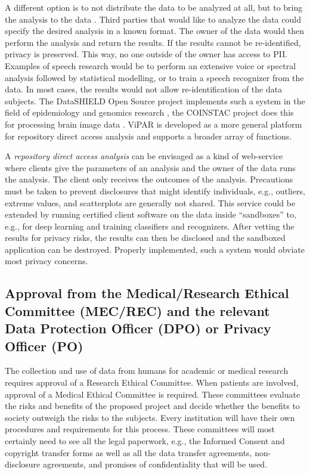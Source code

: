 \documentclass[10pt, a4paper]{article}
\begin{document}
A different option is to not distribute the data to be analyzed at all, but to bring the analysis to the data \cite{budin2015datashield,DataSHIELD2014}. Third parties that would like to analyze the data could specify the desired analysis in a known format. The owner of the data would then perform the analysis and return the results. If the results cannot be re-identified, privacy is preserved. This way, no one outside of the owner has access to PII. Examples of speech research would be to perform an extensive voice or spectral analysis followed by statistical modelling, or to train a speech recognizer from the data. In most cases, the results would not allow re-identification of the data subjects. The DataSHIELD Open Source project implements such a system in the field of epidemiology and genomics research \cite{DataSHIELD,DataSHIELD2014,wilson2017datashield,budin2015datashield}, the COINSTAC project does this for processing brain image data \cite{plis2016coinstac}. ViPAR \cite{carter2016vipar} is developed as a more general platform for repository direct access analysis and supports a broader array of functions.

A {\em repository direct access analysis} can be envisaged as a kind of web-service where clients give the parameters of an analysis and the owner of the data runs the analysis. The client only receives the outcomes of the analysis. Precautions must be taken to prevent disclosures that might identify individuals, e.g., outliers, extreme values, and scatterplots are generally not shared. This service could be extended by running certified client software on the data inside ``sandboxes'' to, e.g., for deep learning and training classifiers and recognizers. After vetting the results for privacy risks, the results can then be disclosed and the sandboxed application can be destroyed. Properly implemented, such a system would obviate most privacy concerns.

\subsection{Approval from the Medical/Research Ethical Committee (MEC/REC) and the relevant Data Protection Officer (DPO) or Privacy Officer (PO)}

The collection and use of data from humans for academic or medical research requires approval of a Research Ethical Committee. When patients are involved, approval of a Medical Ethical Committee is required. These committees evaluate the risks and benefits of the proposed project and decide whether the benefits to society outweigh the risks to the subjects. Every institution will have their own procedures and requirements for this process. These committees will most certainly need to see all the legal paperwork, e.g., the Informed Consent and copyright transfer forms as well as all the data transfer agreements, non-disclosure agreements, and promises of confidentiality that will be used.
\end{document}
